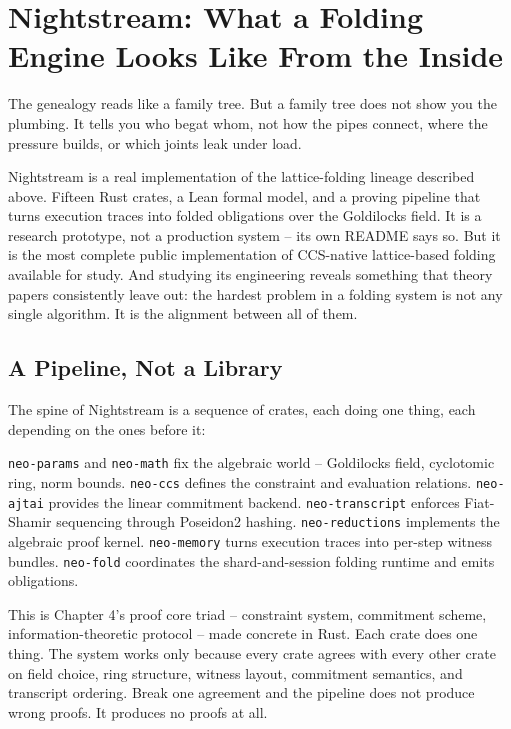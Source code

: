 \documentclass[
  11pt,
  openany]{report}
\begin{document}
\section{Nightstream: What a Folding Engine Looks Like From the
Inside}\label{nightstream-what-a-folding-engine-looks-like-from-the-inside}

The genealogy reads like a family tree. But a family tree does not show you the
plumbing. It tells you who begat whom, not how the pipes connect, where the
pressure builds, or which joints leak under load.

Nightstream is a real implementation of the lattice-folding lineage described
above. Fifteen Rust crates, a Lean formal model, and a proving pipeline that
turns execution traces into folded obligations over the Goldilocks field. It is
a research prototype, not a production system -- its own README says so. But it
is the most complete public implementation of CCS-native lattice-based folding
available for study. And studying its engineering reveals something that theory
papers consistently leave out: the hardest problem in a folding system is not
any single algorithm. It is the alignment between all of them.

\subsection{A Pipeline, Not a Library}\label{a-pipeline-not-a-library}

The spine of Nightstream is a sequence of crates, each doing one thing, each
depending on the ones before it:

\texttt{neo-params} and \texttt{neo-math} fix the algebraic world -- Goldilocks
field, cyclotomic ring, norm bounds. \texttt{neo-ccs} defines the constraint and
evaluation relations. \texttt{neo-ajtai} provides the linear commitment backend.
\texttt{neo-transcript} enforces Fiat-Shamir sequencing through Poseidon2
hashing. \texttt{neo-reductions} implements the algebraic proof kernel.
\texttt{neo-memory} turns execution traces into per-step witness bundles.
\texttt{neo-fold} coordinates the shard-and-session folding runtime and emits
obligations.

This is Chapter 4's proof core triad -- constraint system, commitment scheme,
information-theoretic protocol -- made concrete in Rust. Each crate does one
thing. The system works only because every crate agrees with every other crate
on field choice, ring structure, witness layout, commitment semantics, and
transcript ordering. Break one agreement and the pipeline does not produce wrong
proofs. It produces no proofs at all.
\end{document}
